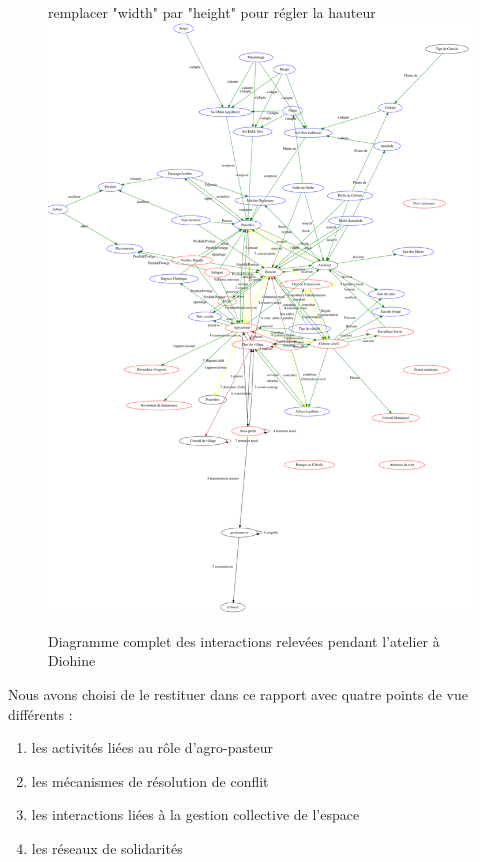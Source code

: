 \begin{figure}
  \begin{center}
  remplacer "width" par "height" pour régler la hauteur
  \includegraphics[width=15cm]{img/pardi_fdp.png}
  \end{center}
  \caption{Diagramme complet des interactions relevées pendant l'atelier à Diohine }
  \label{diag_complet}
\end{figure}

Nous avons choisi de le restituer dans ce rapport avec quatre points de vue différents :
\begin{enumerate}
  \item les activités liées au rôle d'agro-pasteur
  \item les mécanismes de résolution de conflit
  \item les interactions liées à la gestion collective de l'espace
  \item les réseaux de solidarités
\end{enumerate}
